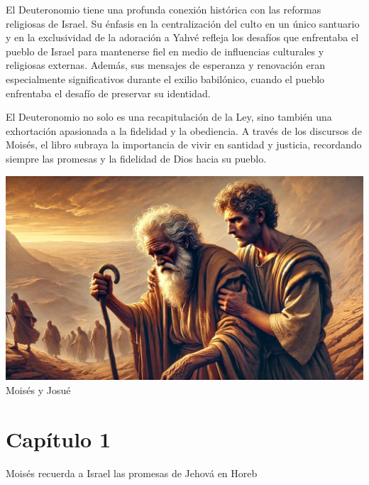 El Deuteronomio tiene una profunda conexión histórica con las reformas religiosas de Israel. Su énfasis en la centralización del culto en un único santuario y en la exclusividad de la adoración a Yahvé refleja los desafíos que enfrentaba el pueblo de Israel para mantenerse fiel en medio de influencias culturales y religiosas externas. Además, sus mensajes de esperanza y renovación eran especialmente significativos durante el exilio babilónico, cuando el pueblo enfrentaba el desafío de preservar su identidad.



El Deuteronomio no solo es una recapitulación de la Ley, sino también una exhortación apasionada a la fidelidad y la obediencia. A través de los discursos de Moisés, el libro subraya la importancia de vivir en santidad y justicia, recordando siempre las promesas y la fidelidad de Dios hacia su pueblo.


\begin{center}
		\includegraphics[width=0.7\linewidth]{graficas/deuteromonio}\\
	Moisés y Josué\\
\end{center}





\section*{Capítulo 1}


{Moisés recuerda a Israel las promesas de Jehová en Horeb } 



